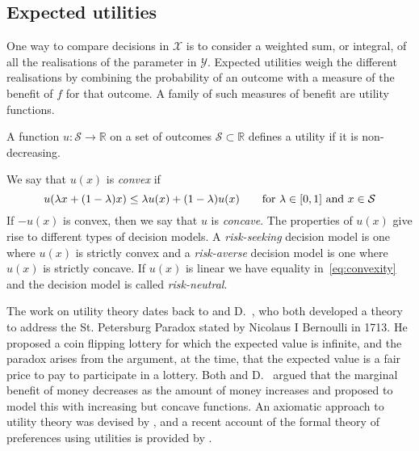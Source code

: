 \documentclass[main.tex]{subfiles}
\begin{document}
\subsection{Expected utilities}
One way to compare decisions in $\mathcal{X}$ is to consider a weighted
sum, or integral, of all the realisations of the parameter in $\mathcal{Y}$.
Expected utilities weigh the different realisations by combining the
probability of an outcome with a measure of the benefit of $f$ for that
outcome.
A family of such measures of benefit are utility functions.
\begin{mydef}
  A function $u:\mathcal{S}\to\mathbb{R}$ on a set of outcomes
  $\mathcal{S}\subset \mathbb{R}$ defines a utility if
  it is non-decreasing.
\end{mydef}

\begin{mydef}[Convexity]
  We say that $u(x)$ is \emph{convex} if
  \begin{equation}\label{eq:convexity}
    u(\lambda x + (1-\lambda)x)\leq
    \lambda u(x) + (1-\lambda) u(x)\qquad \textnormal{for $\lambda\in[0,1]$ and
      $x\in\mathcal{S}$}
  \end{equation}
  If $-u(x)$ is convex, then we say that $u$ is
  \emph{concave}.
  The properties of $u(x)$ give rise to different types of decision models.
  A \emph{risk-seeking} decision model is one where $u(x)$
  is strictly convex and a \emph{risk-averse} decision model is one where
  $u(x)$ is strictly concave.
  If $u(x)$ is linear we have equality in~\eqref{eq:convexity} and
  the decision model is called \emph{risk-neutral}.
\end{mydef}

The work on utility theory dates back to \citet{cramer1728utility} and
D.~\citet{bernoulli1738specimen}, who both developed a theory
to address the St. Petersburg Paradox stated by Nicolaus I Bernoulli
in 1713. He proposed a coin flipping lottery for which the
expected value is infinite, and the paradox arises from the
argument, at the time, that the expected value is a fair price to
pay to participate in a lottery.
Both \citeauthor{cramer1728utility} and
D.~\citeauthor{bernoulli1738specimen} argued that the marginal benefit
of money decreases as the amount of money increases and proposed to
model this with increasing but concave functions.
An axiomatic approach to utility theory was devised by
\citet{neumann1953theory}, and
a recent account of the formal theory of preferences using utilities
is provided by \citet[Ch.~2]{follmer2004stochastic}.
\end{document}
